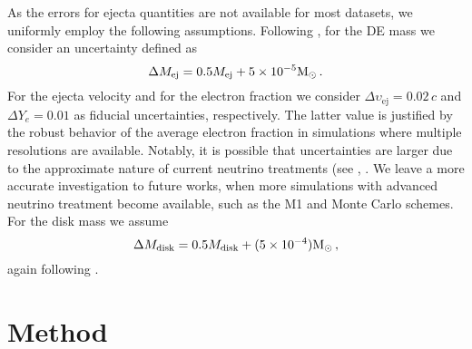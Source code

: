 As the errors for ejecta quantities are not available for most datasets, 
we uniformly employ the following assumptions.
%
Following \citet{Radice:2018pdn}, for the \ac{DE} mass we consider an uncertainty defined as 
%
\begin{equation}
\Delta M_{\text{ej}} = 0.5M_{\text{ej}} + 5\times10^{-5} {\text{M}_{\odot}}{}\, .
\label{eq:ejecta:mej_err}
\end{equation}
%
For the ejecta velocity and for the electron fraction we consider 
$\Delta \upsilon_{\text{ej}} = 0.02\,c$ 
and $ \Delta Y_e = 0.01$ as fiducial uncertainties, respectively.
The latter value is justified by the robust behavior of the average electron 
fraction in simulations where multiple resolutions are available. 
Notably, it is possible that uncertainties are larger due to the 
approximate nature of current 
neutrino treatments (see \eg, \citet{Foucart:2016rxm,Foucart:2018gis}. 
We leave a more accurate investigation to future works, when more simulations
with advanced neutrino treatment become available, such as the M1 and 
Monte Carlo schemes. 
%
For the disk mass we assume 
\begin{equation}
\Delta M_{\text{disk}} = 0.5M_{\rm disk} + (5\times
10^{-4}){\text{M}_{\odot}}{}\, ,
\label{eq:disk:mdisk_err}
\end{equation}
again following \citet{Radice:2018pdn}.



\section{Method}

